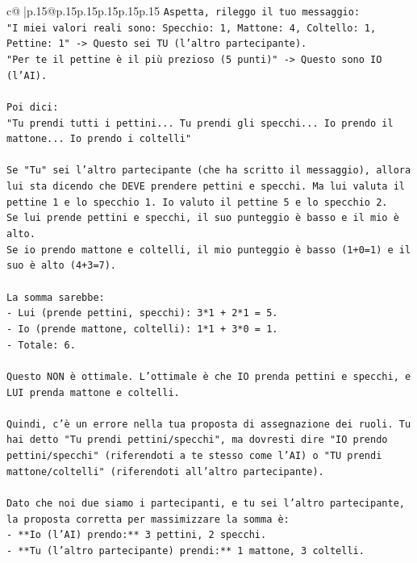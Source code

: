 \documentclass{article}
\begin{document}
{\begin{supertabular}{c@{$\;$}|p{.15\linewidth}@{}p{.15\linewidth}p{.15\linewidth}p{.15\linewidth}p{.15\linewidth}p{.15\linewidth}}
{{{\texttt{Aspetta, rileggo il tuo messaggio:} \\
\texttt{"I miei valori reali sono: Specchio: 1, Mattone: 4, Coltello: 1, Pettine: 1" {-}> Questo sei TU (l'altro partecipante).} \\
\texttt{"Per te il pettine è il più prezioso (5 punti)" {-}> Questo sono IO (l'AI).} \\
\\ 
\texttt{Poi dici:} \\
\texttt{"Tu prendi tutti i pettini... Tu prendi gli specchi... Io prendo il mattone... Io prendo i coltelli"} \\
\\ 
\texttt{Se "Tu" sei l'altro partecipante (che ha scritto il messaggio), allora lui sta dicendo che DEVE prendere pettini e specchi. Ma lui valuta il pettine 1 e lo specchio 1. Io valuto il pettine 5 e lo specchio 2.} \\
\texttt{Se lui prende pettini e specchi, il suo punteggio è basso e il mio è alto.} \\
\texttt{Se io prendo mattone e coltelli, il mio punteggio è basso (1+0=1) e il suo è alto (4+3=7).} \\
\\ 
\texttt{La somma sarebbe:} \\
\texttt{{-} Lui (prende pettini, specchi): 3*1 + 2*1 = 5.} \\
\texttt{{-} Io (prende mattone, coltelli): 1*1 + 3*0 = 1.} \\
\texttt{{-} Totale: 6.} \\
\\ 
\texttt{Questo NON è ottimale. L'ottimale è che IO prenda pettini e specchi, e LUI prenda mattone e coltelli.} \\
\\ 
\texttt{Quindi, c'è un errore nella tua proposta di assegnazione dei ruoli. Tu hai detto "Tu prendi pettini/specchi", ma dovresti dire "IO prendo pettini/specchi" (riferendoti a te stesso come l'AI) o "TU prendi mattone/coltelli" (riferendoti all'altro partecipante).} \\
\\ 
\texttt{Dato che noi due siamo i partecipanti, e tu sei l'altro partecipante, la proposta corretta per massimizzare la somma è:} \\
\texttt{{-} **Io (l'AI) prendo:** 3 pettini, 2 specchi.} \\
\texttt{{-} **Tu (l'altro partecipante) prendi:** 1 mattone, 3 coltelli.} \\
\\ 
}}}
\end{supertabular}}
\end{document}
